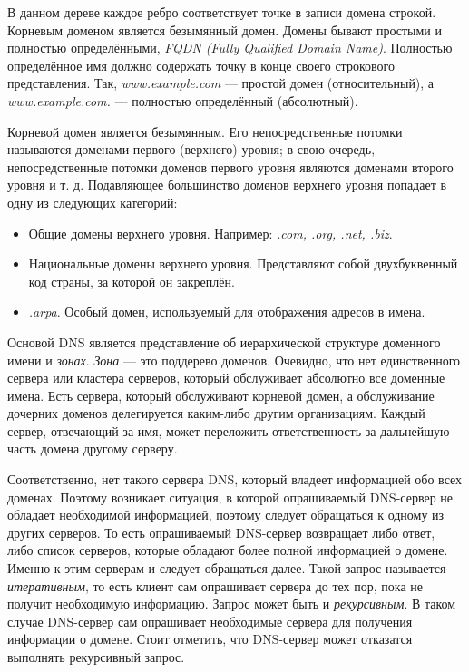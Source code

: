 В данном дереве каждое ребро соответствует точке в записи домена строкой. Корневым доменом является безымянный домен. Домены бывают простыми и полностью определёнными, \emph{FQDN (Fully Qualified Domain Name)}. Полностью определённое имя должно содержать точку в конце своего строкового представления. Так, \emph{www.example.com} — простой домен (относительный), а \emph{www.example.com.} — полностью определённый (абсолютный).

Корневой домен является безымянным. Его непосредственные потомки называются доменами первого (верхнего) уровня; в свою очередь, непосредственные потомки доменов первого уровня являются доменами второго уровня и т. д. Подавляющее большинство доменов верхнего уровня попадает в одну из следующих категорий:
\begin{itemize}
  \item Общие домены верхнего уровня. Например: \emph{.com, .org, .net, .biz}.
  \item Национальные домены верхнего уровня. Представляют собой двухбуквенный код страны, за которой он закреплён.
  \item \emph{.arpa}. Особый домен, используемый для отображения адресов в имена.
\end{itemize}

Основой DNS является представление об иерархической структуре доменного имени и \emph{зонах}. \emph{Зона} — это поддерево доменов. Очевидно, что нет единственного сервера или кластера серверов, который обслуживает абсолютно все доменные имена. Есть сервера, который обслуживают корневой домен, а обслуживание дочерних доменов делегируется каким-либо другим организациям. Каждый сервер, отвечающий за имя, может переложить ответственность за дальнейшую часть домена другому серверу.

Соответственно, нет такого сервера DNS, который владеет информацией обо всех доменах. Поэтому возникает ситуация, в которой опрашиваемый DNS-сервер не обладает необходимой информацией, поэтому следует обращаться к одному из других серверов. То есть опрашиваемый DNS-сервер возвращает либо ответ, либо список серверов, которые обладают более полной информацией о домене. Именно к этим серверам и следует обращаться далее. Такой запрос называется \emph{итеративным}, то есть клиент сам опрашивает сервера до тех пор, пока не получит необходимую информацию. Запрос может быть и \emph{рекурсивным}. В таком случае DNS-сервер сам опрашивает необходимые сервера для получения информации о домене. Стоит отметить, что DNS-сервер может отказатся выполнять рекурсивный запрос.

